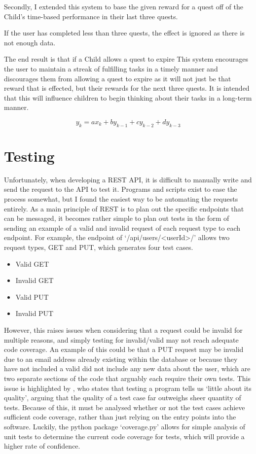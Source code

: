 Secondly, I extended this system to base the given reward for a quest off of the Child's time-based performance in their last three quests.

If the user has completed less than three quests, the effect is ignored as there is not enough data.

The end result is that if a Child allows a quest to expire
This system encourages the user to maintain a streak of fulfilling tasks in a timely manner and discourages them from allowing a quest to expire as it will not just be that reward that is effected, but their rewards for the next three quests.
It is intended that this will influence children to begin thinking about their tasks in a long-term manner.

\begin{equation} \label{eq:openloopreward}
	y_k = ax_k + by_{k-1} + cy_{k-2} + dy_{k-3}
\end{equation}




\section{Testing}
Unfortunately, when developing a REST API, it is difficult to manually write and send the request to the API to test it.
Programs and scripts exist to ease the process somewhat, but I found the easiest way to be automating the requests entirely. 
As a main principle of REST is to plan out the specific endpoints that can be messaged, it becomes rather simple to plan out tests in the form of sending an example of a valid and invalid request of each request type to each endpoint.
For example, the endpoint of `/api/users/<userId>/' allows two request types, GET and PUT, which generates four test cases.
\begin{itemize}
	\item{Valid GET}
	\item{Invalid GET}
	\item{Valid PUT}
	\item{Invalid PUT}
\end{itemize}  

However, this raises issues when considering that a request could be invalid for multiple reasons, and simply testing for invalid/valid may not reach adequate code coverage.
An example of this could be that a PUT request may be invalid due to an email address already existing within the database or because they have not included a valid did not include any new data about the user, which are two separate sections of the code that arguably each require their own tests.
This issue is highlighted by \cite{4597151}, who states that testing a program tells us `little about its quality', arguing that the quality of a test case far outweighs sheer quantity of tests.
Because of this, it must be analysed whether or not the test cases achieve sufficient code coverage, rather than just relying on the entry points into the software.
Luckily, the python package `coverage.py' allows for simple analysis of unit tests to determine the current code coverage for tests, which will provide a higher rate of confidence.

